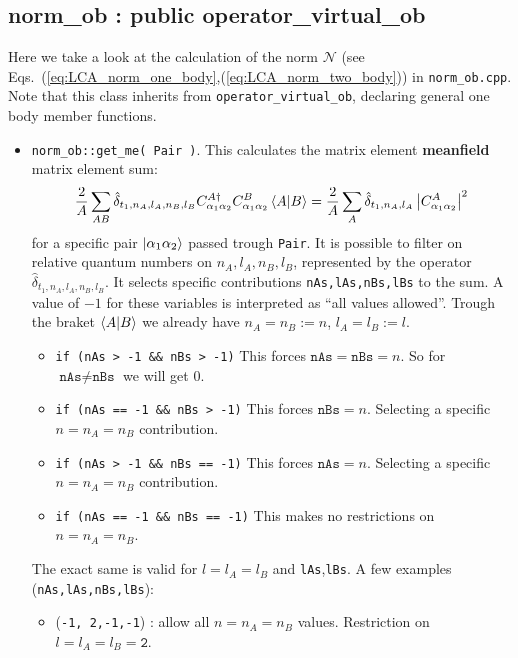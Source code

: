 \documentclass[10pt]{article}
\begin{document}
\subsection{norm\_ob : public operator\_virtual\_ob}
Here we take a look at the calculation of the norm $\mathcal{N}$ (see Eqs.~(\ref{eq:LCA_norm_one_body},(\ref{eq:LCA_norm_two_body})) in \texttt{norm\_ob.cpp}.
Note that this class inherits from \texttt{operator\_virtual\_ob}, declaring general one body member functions.
\begin{itemize}
	\item \texttt{norm\_ob::get\_me( Pair )}.
		This calculates the matrix element \textbf{meanfield} matrix element sum:
		\begin{equation}
		\frac{2}{A} \sum_{ A B } \hat{\delta}_{t_1,n_A,l_A,n_B,l_B} C_{\alpha_1 \alpha_2}^{A \dagger} C_{\alpha_1 \alpha_2}^{B} \braket{ A|B} = \frac{2}{A} \sum_{A} \hat{\delta}_{t_1,n_A,l_A} \left| C_{\alpha_1 \alpha_2}^{A} \right|^{2}
		\end{equation}
		for a specific pair $\ket{\alpha_1 \alpha_2}$ passed trough \texttt{Pair}.
		It is possible to filter on relative quantum numbers on $n_A,l_A,n_B,l_B$, represented by the operator $\hat{\delta}_{t_1,n_A,l_A,n_B,l_B}$. It selects specific contributions \texttt{nAs,lAs,nBs,lBs} to the sum. A value of $-1$ for these variables is interpreted as ``all values allowed''. Trough the braket $\braket{ A | B }$ we already have $n_A = n_B := n$, $l_A = l_B := l$.
		\begin{itemize}
			\item \texttt{if (nAs > -1 \&\& nBs > -1)}
				This forces $\texttt{nAs} = \texttt{nBs} = n$. So for $\texttt{nAs} \neq \texttt{nBs}$ we will get $0$.
			\item \texttt{if (nAs == -1 \&\& nBs > -1)}
				This forces $\texttt{nBs} = n$. Selecting a specific $n = n_A = n_B$ contribution.
			\item \texttt{if (nAs > -1 \&\& nBs == -1)}
				This forces $\texttt{nAs} = n$. Selecting a specific $n = n_A = n_B$ contribution.
			\item \texttt{if (nAs == -1 \&\& nBs == -1)}
				This makes no restrictions on $n = n_A = n_B$.
		\end{itemize}
		The exact same is valid for $l = l_A = l_B$ and \texttt{lAs},\texttt{lBs}.
		A few examples (\texttt{nAs,lAs,nBs,lBs}):
		\begin{itemize}
			\item (\texttt{-1, 2,-1,-1}) : allow all $n = n_A = n_B$ values. Restriction on $l = l_A = l_B = \texttt{2}$.

\end{itemize}
\end{itemize}
\end{document}
